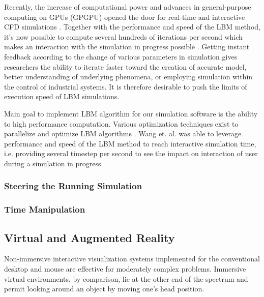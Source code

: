 Recently, the increase of computational power and advances in general-purpose computing on GPUs (GPGPU) opened the door for real-time and interactive CFD simulations \cite{delboscOptimizedImplementationLattice2014, delboscRealTimeSimulationIndoor, harwoodParallelisationInteractiveLatticeBoltzmann2017, kolihaOnlineVisualizationInteractive2015, glessmerUsingInteractiveLattice2017}. Together with the performance and speed of the LBM method, it's now possible to compute several hundreds of iterations per second which makes an interaction with the simulation in progress possible \cite{wangInteractive3DFluid2019}. Getting instant feedback according to the change of various parameters in simulation gives researchers the ability to iterate faster toward the creation of accurate model, better understanding of underlying phenomena, or employing simulation within the control of industrial systems. It is therefore desirable to push the limits of execution speed of LBM simulations.

Main goal to implement LBM algorithm for our simulation software is the ability to high performance computation. Various optimization techniques exist to parallelize and optimize LBM algorithms \cite{wangInteractive3DFluid2019, wittmannLatticeBoltzmannBenchmark2018, tranPerformanceOptimization3D2017, kornerParallelLatticeBoltzmann2006, harwoodParallelisationInteractiveLatticeBoltzmann2017, harwoodREALTIMEMODELLINGSIMULATION}. Wang et. al. \cite{wangInteractive3DFluid2019} was able to leverage performance and speed of the LBM method to reach interactive simulation time, i.e. providing several timestep per second to see the impact on interaction of user during a simulation in progress.

\subsubsection{Steering the Running Simulation}

\subsubsection{Time Manipulation}

\subsection{Virtual and Augmented Reality}

Non-immersive interactive visualization systems implemented for the conventional desktop and mouse are effective for moderately complex problems. Immersive virtual environments, by comparison, lie at the other end of the spectrum and permit looking around an object by moving one's head position.

